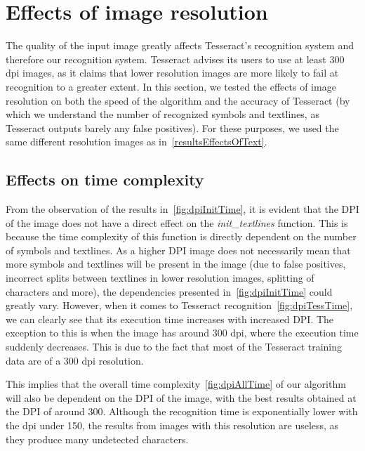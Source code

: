 \section{Effects of image resolution}

The quality of the input image greatly affects Tesseract's recognition system and therefore our recognition system. Tesseract advises its users to use at least 300 dpi images, as it claims that lower resolution images are more likely to fail at recognition to a greater extent. In this section, we tested the effects of image resolution on both the speed of the algorithm and the accuracy of Tesseract (by which we understand the number of recognized symbols and textlines, as Tesseract outputs barely any false positives). For these purposes, we used the same different resolution images as in~\cref{resultsEffectsOfText}.

\subsection{Effects on time complexity}

From the observation of the results in~\cref{fig:dpiInitTime}, it is evident that the DPI of the image does not have a direct effect on the \emph{init\_textlines} function. This is because the time complexity of this function is directly dependent on the number of symbols and textlines. As a higher DPI image does not necessarily mean that more symbols and textlines will be present in the image (due to false positives, incorrect splits between textlines in lower resolution images, splitting of characters and more), the dependencies presented in~\cref{fig:dpiInitTime} could greatly vary. However, when it comes to Tesseract recognition~\cref{fig:dpiTessTime}, we can clearly see that its execution time increases with increased DPI. The exception to this is when the image has around 300 dpi, where the execution time suddenly decreases. This is due to the fact that most of the Tesseract training data are of a 300 dpi resolution.

This implies that the overall time complexity~\cref{fig:dpiAllTime} of our algorithm will also be dependent on the DPI of the image, with the best results obtained at the DPI of around 300. Although the recognition time is exponentially lower with the dpi under 150, the results from images with this resolution are useless, as they produce many undetected characters.

